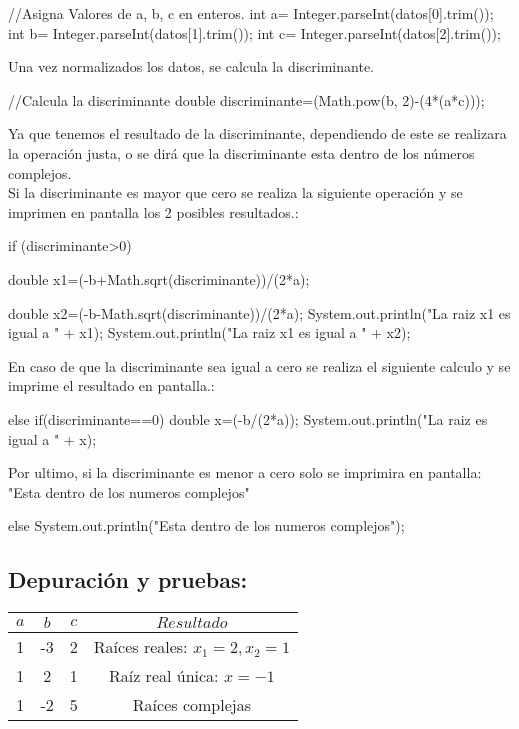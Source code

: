 \begin{javaCode}
    //Asigna Valores de a, b, c en enteros.
        int a= Integer.parseInt(datos[0].trim());
        int b= Integer.parseInt(datos[1].trim());
        int c= Integer.parseInt(datos[2].trim());
        
\end{javaCode}
Una vez normalizados los datos, se calcula la discriminante.
\begin{javaCode}
    //Calcula la discriminante
    double discriminante=(Math.pow(b, 2)-(4*(a*c)));
\end{javaCode}

Ya que tenemos el resultado de la discriminante, dependiendo de este se realizara la operación justa, o se dirá que la discriminante esta dentro de los números complejos.\\
Si la discriminante es mayor que cero se realiza la siguiente operación y se imprimen en pantalla los 2 posibles resultados.:
\begin{javaCode}
    if (discriminante>0) {
            double x1=(-b+Math.sqrt(discriminante))/(2*a);
            
            double x2=(-b-Math.sqrt(discriminante))/(2*a);
            System.out.println("La raiz x1 es igual a " + x1);
            System.out.println("La raiz x1 es igual a " + x2);
            
        }
\end{javaCode}
En caso de que la discriminante sea igual a cero se realiza el siguiente calculo y se imprime el resultado en pantalla.:
\begin{javaCode}
    else if(discriminante==0){
            double x=(-b/(2*a));
            System.out.println("La raiz es igual a " + x);
        }
\end{javaCode}
Por ultimo, si la discriminante es menor a cero solo se imprimira en pantalla:\\"Esta dentro de los numeros complejos"
\begin{javaCode}
    else{
            System.out.println("Esta dentro de los numeros complejos");
        }
\end{javaCode}

\subsection{\textbf{Depuración y pruebas:}}
\begin{center}
    \begin{tabular}{|c|c|c|c|}
    \hline
    \textbf{\(a\)} & \textbf{\(b\)} & \textbf{\(c\)} & \textbf{\(Resultado\)} \\
    \hline
    1 & -3 & 2 & Raíces reales: \(x_1 = 2, x_2 = 1\) \\
    \hline
    1 & 2 & 1 & Raíz real única: \(x = -1\) \\
    \hline
    1 & -2 & 5 & Raíces complejas \\
    \hline
    \end{tabular}
    \end{center}
    
    \clearpage